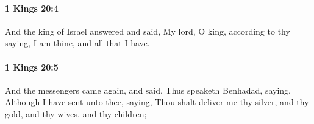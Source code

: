		\paragraph{1 Kings 20:4} %
			\label{1KINGS-20-4}

			And the king of Israel answered and said, My lord, O king, according to thy saying, I am thine, and all that I have.


		\paragraph{1 Kings 20:5} %
			\label{1KINGS-20-5}

			And the messengers came again, and said, Thus speaketh Benhadad, saying, Although I have sent unto thee, saying, Thou shalt deliver me thy silver, and thy gold, and thy wives, and thy children;


